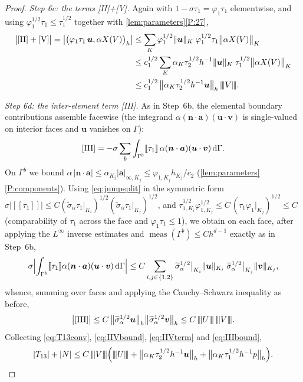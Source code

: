 \documentclass[11pt,a4paper]{article}
\newcommand{\bu}{\boldsymbol{u}}
\newcommand{\bv}{\boldsymbol{v}}
\newcommand{\ba}{\boldsymbol{a}}
\newcommand{\bn}{\boldsymbol{n}}
\newcommand{\X}{X}
\newcommand{\dd}{\,\mathrm{d}}
\newcommand{\jump}[1]{[\![#1]\!]}
\DeclarePairedDelimiter{\norm}{\lVert}{\rVert}
\newcommand{\triplenorm}[1]{{\lvert\kern-0.25ex\lvert\kern-0.25ex\lvert #1
\rvert\kern-0.25ex\rvert\kern-0.25ex\rvert}}
\newcommand{\sigmatilde}{\widetilde{\sigma}_{\alpha}}
\theoremstyle{plain}
\theoremstyle{remark}
\theoremstyle{definition}
\numberwithin{equation}{section}
\begin{document}
\begin{proof}
\smallskip\noindent\emph{Step 6c: the terms \textup{[II]+[V]}.}
Again with $1-\sigma\tau_1=\varphi_1\tau_1$ elementwise, and using
$\varphi_1^{1/2}\tau_1\le\tau_1^{1/2}$ together with
\cref{lem:parameters}\ref{P:27},
\begin{align}
  \bigl|\textup{[II]}+\textup{[V]}\bigr|
  = \bigl|\bigl(\varphi_1\tau_1\,\bu,\alpha\X(V)\bigr)_h\bigr|
  &\le \sum_K \varphi_1^{1/2}\norm{\bu}_K\;
  \varphi_1^{1/2}\tau_1\bigl\lVert\alpha\X(V)\bigr\rVert_K
  \nonumber\\
  &\le c_1^{1/2}\sum_K \alpha_K\tau_2^{1/2}h^{-1}\norm{\bu}_K\;
  \tau_1^{1/2}\bigl\lVert\alpha\X(V)\bigr\rVert_K
  \nonumber\\
  &\le c_1^{1/2}\,
  \bigl\lVert\alpha_K\tau_2^{1/2}h^{-1}\bu\bigr\rVert_h\,\triplenorm{V}.
  \label{eq:IIVterm}
\end{align}

\smallskip\noindent\emph{Step 6d: the inter-element term \textup{[III]}.}
As in Step~6b, the elemental boundary contributions assemble facewise (the integrand
$\alpha(\bn\cdot\ba)(\bu\cdot\bv)$ is single-valued on interior faces and $\bu$ vanishes
on $\Gamma$):
\begin{equation*}
  \textup{[III]}
  = -\sigma\sum_b\int_{\Gamma^b}\jump{\tau_1}\,
  \alpha(\bn\cdot\ba)(\bu\cdot\bv)\dd\Gamma .
\end{equation*}
On $\Gamma^b$ we bound $\alpha\,|\bn\cdot\ba|\le\alpha_{K_j}|\ba|_{\infty,K_j}
\le\varphi_{1,K_j}h_{K_j}/c_2$ (\cref{lem:parameters}\ref{P:components}). Using
\eqref{eq:jumpsplit} in the symmetric form
$\sigma|\jump{\tau_1}|\le C(\sigmatilde\tau_1|_{K_i})^{1/2}
(\sigmatilde\tau_1|_{K_j})^{1/2}$, and
$\tau_{1,K_i}^{1/2}\varphi_{1,K_j}^{1/2}\le C\,(\tau_1\varphi_1|_{K_j})^{1/2}\le C$ (comparability of $\tau_1$ across the face
and $\varphi_1\tau_1\le1$), we obtain on each face, after applying the $L^\infty$ inverse
estimates and $\operatorname{meas}(\Gamma^b)\le Ch^{d-1}$ exactly as in Step~6b,
\begin{equation}\label{eq:IIIface}
  \sigma\Bigl|\int_{\Gamma^b}\jump{\tau_1}\alpha(\bn\cdot\ba)(\bu\cdot\bv)
  \dd\Gamma\Bigr|
  \le C\sum_{i,j\in\{1,2\}}
  \sigmatilde^{1/2}\big|_{K_i}\norm{\bu}_{K_i}\;
  \sigmatilde^{1/2}\big|_{K_j}\norm{\bv}_{K_j},
\end{equation}
whence, summing over faces and applying the Cauchy--Schwarz inequality as before,
\begin{equation}\label{eq:IIIbound}
  \bigl|\textup{[III]}\bigr|
  \le C\,\bigl\lVert\sigmatilde^{1/2}\bu\bigr\rVert_h
  \bigl\lVert\sigmatilde^{1/2}\bv\bigr\rVert_h
  \le C\,\triplenorm{U}\,\triplenorm{V}.
\end{equation}
Collecting \eqref{eq:T13conv}, \eqref{eq:IIVbound}, \eqref{eq:IIVterm} and
\eqref{eq:IIIbound},
\begin{equation}\label{eq:groupstep}
  |T_{13}| + |N|
  \le C\,\triplenorm{V}\Bigl(\triplenorm{U}
  + \bigl\lVert\alpha_K\tau_2^{1/2}h^{-1}\bu\bigr\rVert_h
  + \bigl\lVert\alpha_K\tau_1^{1/2}h^{-1}p\bigr\rVert_h\Bigr).
\end{equation}


\end{proof}
\end{document}
